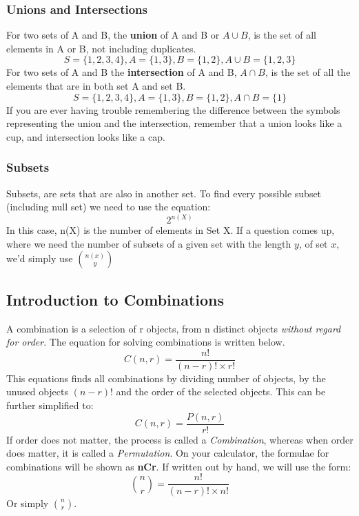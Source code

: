 \documentclass[final,1p,12pt]{elsarticle}
\begin{document}
        \subsubsection{Unions and Intersections}
        For two sets of A and B, the \textbf{union} of A and B or $A\cup B$, is the set of all elements in A or B, not including duplicates.
        \begin{equation}
            S = \{1,2,3,4\}, A = \{1,3\}, B =\{1,2\}, A\cup B=\{1,2,3\}
        \end{equation}
        For two sets of A and B the \textbf{intersection} of A and B, $A\cap B$, is the set of all the elements that are in both set A and set B.
        \begin{equation}
            S = \{1,2,3,4\}, A = \{1,3\}, B =\{1,2\}, A\cap B=\{1\}
        \end{equation}
        If you are ever having trouble remembering the difference between the symbols representing the union and the intersection, remember that a union looks like a cup, and intersection looks like a cap.
        
        \subsubsection{Subsets}
        Subsets, are sets that are also in another set. To find every possible subset (including null set) we need to use the equation:
        \begin{equation}
            2^{n(X)}
        \end{equation}
        In this case, n(X) is the number of elements in Set X. If a question comes up, where we need the number of subsets of a given set with the length $y$, of set $x$, we'd simply use $\binom{n(x)}{y}$
        
    \subsection{Introduction to Combinations}
    A combination is a selection of r objects, from n distinct objects \emph{without regard for order}. The equation for solving combinations is written below.
    \begin{equation}
        C(n,r) = \frac{n!}{(n-r)!\times r!}
    \end{equation}
    This equations finds all combinations by dividing number of objects, by the unused objects $(n-r)!$ and the order of the selected objects. This can be further simplified to:
    \begin{equation}
        C(n,r) = \frac{P(n,r)}{r!}
    \end{equation}
    If order does not matter, the process is called a \emph{Combination}, whereas when order does matter, it is called a \emph{Permutation}. On your calculator, the formulae for combinations will be shown as \textbf{nCr}. If written out by hand, we will use the form:
    \begin{equation}
        \binom{n}{r} = \frac{n!}{(n-r)!\times n!}
    \end{equation}
    Or simply \(\binom{n}{r}\).
    
\end{document}
